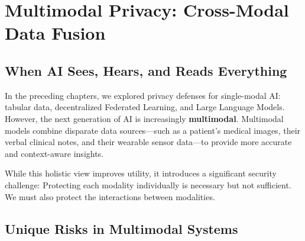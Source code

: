 
\chapter{Multimodal Privacy: Cross-Modal Data Fusion}
\label{chap:multimodal_privacy}


\section{When AI Sees, Hears, and Reads Everything}
\label{sec:multimodal_convergence_ch16}

In the preceding chapters, we explored privacy defenses for single-modal AI: tabular data, decentralized Federated Learning, and Large Language Models. However, the next generation of AI is increasingly \textbf{multimodal}. Multimodal models combine disparate data sources---such as a patient's medical images, their verbal clinical notes, and their wearable sensor data---to provide more accurate and context-aware insights.

While this holistic view improves utility, it introduces a significant security challenge: Protecting each modality individually is necessary but not sufficient. We must also protect the interactions between modalities.

\section{Unique Risks in Multimodal Systems}
\label{sec:multimodal_risks_ch16}

